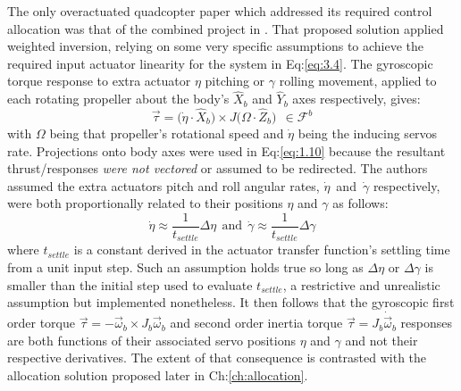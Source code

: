 The only overactuated quadcopter paper which addressed its required control allocation was that of the combined project in \cite{tiltgasco,tiltrihani}. That proposed solution applied weighted inversion, relying on some very specific assumptions to achieve the required input actuator linearity for the system in Eq:\ref{eq:3.4}. The gyroscopic torque response to extra actuator $\eta$ pitching or $\gamma$ rolling movement, applied to each rotating propeller about the body's $\hat{X}_b$ and $\hat{Y}_b$ axes respectively, gives:
\begin{equation}\label{eq:1.10}
\vec{\tau}=\big(\dot{\eta}\cdot\hat{X}_b\big)\times J\big(\Omega\cdot\hat{Z}_b\big)~~\in\mathcal{F}^b
\end{equation}
with $\Omega$ being that propeller's rotational speed and $\dot{\eta}$ being the inducing servos rate. Projections onto body axes were used in Eq:\ref{eq:1.10} because the resultant thrust/responses \emph{were not vectored} or assumed to be redirected. The authors assumed the extra actuators pitch and roll angular rates, $\dot{\eta}$~and~$\dot{\gamma}$ respectively, were both proportionally related to their positions $\eta$ and $\gamma$ as follows:
\begin{equation}
\dot{\eta}\approx \frac{1}{t_{settle}}\Delta\eta~~\text{and}~~\dot{\gamma}\approx \frac{1}{t_{settle}}\Delta\gamma
\end{equation}
where $t_{settle}$ is a constant derived in the actuator transfer function's settling time from a unit input step. Such an assumption holds true so long as $\Delta\eta$ or $\Delta\gamma$ is smaller than the initial step used to evaluate $t_{settle}$, a restrictive and unrealistic assumption but implemented nonetheless. It then follows that the gyroscopic first order torque $\vec{\tau}=-\vec{\omega}_b\times J_b\vec{\omega}_b$ and second order inertia torque $\vec{\tau}=J_b\dot{\vec{\omega}}_b$ responses are both functions of their associated servo positions $\eta$ and $\gamma$ and not their respective derivatives. The extent of that consequence is contrasted with the allocation solution proposed later in Ch:\ref{ch:allocation}.
